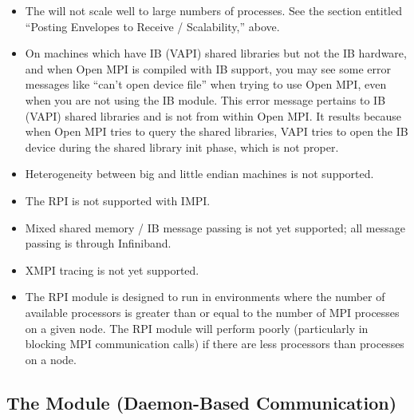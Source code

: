 \begin{itemize}


\item The   will not scale well to large numbers of
  processes.  See the section entitled ``Posting Envelopes to Receive
  / Scalability,'' above.


\item On machines which have IB (VAPI) shared libraries but not the IB
  hardware, and when Open MPI is compiled with IB support, you may see some
  error messages like ``can't open device file'' when trying to use
  Open MPI, even when you are not using the IB module.  This error
  message pertains to IB (VAPI) shared libraries and is not from
  within Open MPI.  It results because when Open MPI tries to query the
  shared libraries, VAPI tries to open the IB device during the shared
  library init phase, which is not proper.  

\item Heterogeneity between big and little endian machines is not
  supported.
  
\item The  RPI is not supported with IMPI.
  
\item Mixed shared memory / IB message passing is not yet supported;
  all message passing is through Infiniband.
  
\item XMPI tracing is not yet supported.

\item The  RPI module is designed to run in environments where
  the number of available processors is greater than or equal to the
  number of MPI processes on a given node.  The  RPI module
  will perform poorly (particularly in blocking MPI communication
  calls) if there are less processors than processes on a node.


\end{itemize}


\subsection{The  Module (Daemon-Based Communication)}

